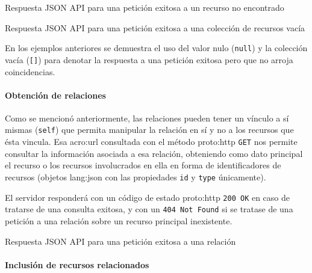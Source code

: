 \begin{listing}
  \caption{Respuesta JSON API para una petición exitosa a un recurso no encontrado}
  \label{soa:tecnologias:json-api:respuesta-200-recurso-nulo}
\end{listing}

\begin{listing}
  \caption{Respuesta JSON API para una petición exitosa a una colección de recursos vacía}
  \label{soa:tecnologias:json-api:respuesta-200-coleccion-vacia}
\end{listing}

En los ejemplos anteriores se demuestra el uso del valor nulo (\texttt{null}) y la colección vacía (\texttt{[]}) para denotar la respuesta a una petición exitosa pero que no arroja coincidencias.

\paragraph{Obtención de relaciones}

Como se mencionó anteriormente, las relaciones pueden tener un vínculo a sí mismas (\texttt{self}) que permita manipular la relación en sí y no a los recursos que ésta vincula. Esa \gls{acro:url} consultada con el método \gls{proto:http} \texttt{GET} nos permite consultar la información asociada a esa relación, obteniendo como dato principal el recurso o los recursos involucrados en ella en forma de identificadores de recursos (objetos \gls{lang:json} con las propiedades \texttt{id} y \texttt{type} únicamente).

El servidor responderá con un código de estado \gls{proto:http} \texttt{200 OK} en caso de tratarse de una consulta exitosa, y con un \texttt{404 Not Found} si se tratase de una petición a una relación sobre un recurso principal inexistente.

\begin{listing}
  \caption{Respuesta JSON API para una petición exitosa a una relación}
  \label{soa:tecnologias:json-api:respuesta-200-obtener-relacion}
\end{listing}

\paragraph{Inclusión de recursos relacionados}

